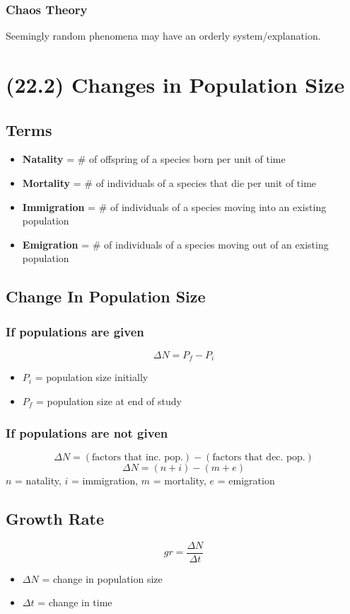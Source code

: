 \documentclass[a4paper,12pt]{article}
\begin{document}
\subsubsection{Chaos Theory}
Seemingly random phenomena may have an orderly system/explanation.

\section{(22.2) Changes in Population Size}
\subsection{Terms}
\begin{itemize}
    \item{\textbf{Natality} = \# of offspring of a species born per unit of time}
    \item{\textbf{Mortality} = \# of individuals of a species that die per unit of time}
    \item{\textbf{Immigration} = \# of individuals of a species moving into an existing population}
    \item{\textbf{Emigration} = \# of individuals of a species moving out of an existing population}
\end{itemize}

\subsection{Change In Population Size}
\subsubsection{If populations are given}
\Huge $$\Delta{N} = P_f - P_i$$ \normalsize
\begin{itemize}
    \item{$P_i$ = population size initially}
    \item{$P_f$ = population size at end of study}
\end{itemize}

\subsubsection{If populations are not given}
$$\Delta{N} = (\textrm{factors that inc. pop.}) - (\textrm{factors that dec. pop.})$$
\Huge $$\Delta{N} = (n + i) - (m + e)$$ \normalsize
$n$ = natality, $i$ = immigration, $m$ = mortality, $e$ = emigration

\subsection{Growth Rate}
\Huge $$gr = \frac{\Delta{N}}{\Delta{t}}$$ \normalsize
\begin{itemize}
    \item{$\Delta{N}$ = change in population size}
    \item{$\Delta{t}$ = change in time}
\end{itemize}
\end{document}
